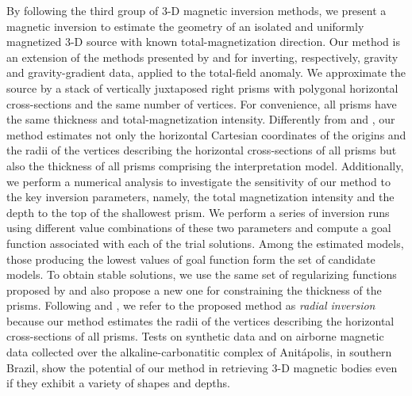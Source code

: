 By following the third group of 3-D magnetic inversion methods, 
we present a magnetic inversion to estimate the geometry of an isolated 
and uniformly magnetized 3-D source with known total-magnetization direction.
Our method is an extension of the methods presented 
by \cite{oliveirajr-etal2011} and \cite{oliveirajr-barbosa2013} for inverting, respectively, 
gravity and gravity-gradient data, applied to the total-field anomaly. 
We approximate the source by a stack of vertically juxtaposed 
right prisms with polygonal horizontal cross-sections and the same number of vertices.
For convenience, all prisms have the same thickness and total-magnetization 
intensity.
Differently from \cite{oliveirajr-etal2011} and \cite{oliveirajr-barbosa2013}, 
our method estimates not only the horizontal Cartesian coordinates of the origins and the radii of the vertices describing the horizontal cross-sections of all prisms but also the thickness of all prisms comprising the interpretation model. Additionally, we perform a numerical analysis to investigate the sensitivity of our method to the key inversion parameters, namely, the total magnetization intensity and the depth to the top 
of the shallowest prism. 
We perform a series of inversion runs using different value combinations of these two parameters and compute a goal function associated with each of the trial solutions.
Among the estimated models, those producing the 
lowest values of goal function form the set of candidate models.
To obtain stable solutions, we use the same set of regularizing functions proposed by 
\cite{oliveirajr-etal2011} and also propose a new one for constraining the 
thickness of the prisms. 
Following \cite{oliveirajr-etal2011} and \cite{oliveirajr-barbosa2013}, we refer to the proposed method as \textit{radial inversion} because our method estimates the radii of the vertices describing the horizontal cross-sections of all prisms.
Tests on synthetic data and on airborne magnetic data collected over the alkaline-carbonatitic complex of Anit{\'a}polis, in southern Brazil, show the potential of our method in retrieving 3-D magnetic bodies even if they exhibit a variety of shapes and depths. 


